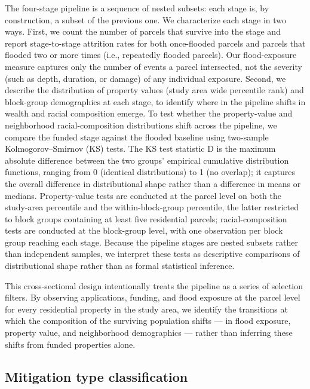\documentclass[
  authoryear,
  preprint]{elsarticle}
\begin{document}
The four-stage pipeline is a sequence of nested subsets: each stage is,
by construction, a subset of the previous one. We characterize each
stage in two ways. First, we count the number of parcels that survive
into the stage and report stage-to-stage attrition rates for both
once-flooded parcels and parcels that flooded two or more times (i.e.,
repeatedly flooded parcels). Our flood-exposure measure captures only
the number of events a parcel intersected, not the severity (such as
depth, duration, or damage) of any individual exposure. Second, we
describe the distribution of property values (study area wide percentile
rank) and block-group demographics at each stage, to identify where in
the pipeline shifts in wealth and racial composition emerge. To test
whether the property-value and neighborhood racial-composition
distributions shift across the pipeline, we compare the funded stage
against the flooded baseline using two-sample Kolmogorov--Smirnov (KS)
tests. The KS test statistic D is the maximum absolute difference
between the two groups' empirical cumulative distribution functions,
ranging from 0 (identical distributions) to 1 (no overlap); it captures
the overall difference in distributional shape rather than a difference
in means or medians. Property-value tests are conducted at the parcel
level on both the study-area percentile and the within-block-group
percentile, the latter restricted to block groups containing at least
five residential parcels; racial-composition tests are conducted at the
block-group level, with one observation per block group reaching each
stage. Because the pipeline stages are nested subsets rather than
independent samples, we interpret these tests as descriptive comparisons
of distributional shape rather than as formal statistical inference.

This cross-sectional design intentionally treats the pipeline as a
series of selection filters. By observing applications, funding, and
flood exposure at the parcel level for every residential property in the
study area, we identify the transitions at which the composition of the
surviving population shifts --- in flood exposure, property value, and
neighborhood demographics --- rather than inferring these shifts from
funded properties alone.

\subsection{Mitigation type
classification}\label{mitigation-type-classification}
\end{document}
